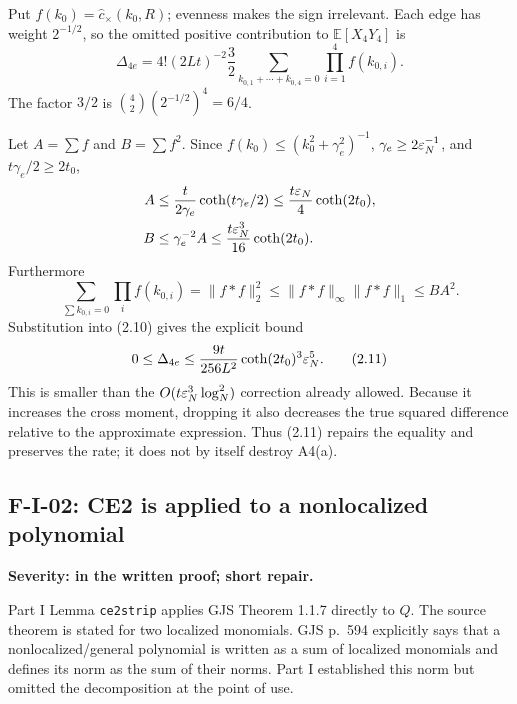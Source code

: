 \documentclass[11pt,a4paper]{article}
\begin{document}
Put $f(k_0)=\widehat c_\times(k_0,R)$; evenness makes the sign irrelevant.  Each edge
has weight $2^{-1/2}$, so the omitted positive contribution to
$\mathbb E[X_4Y_4]$ is
\begin{equation}
 \Delta_{4e}=4!(2Lt)^{-2}\frac32
 \sum_{k_{0,1}+\cdots+k_{0,4}=0}\prod_{i=1}^4f(k_{0,i}).
 \tag{2.10}
\end{equation}
The factor $3/2$ is
$\binom42(2^{-1/2})^4=6/4$.

Let $A=\sum f$ and $B=\sum f^2$.  Since
$f(k_0)\le(k_0^2+\gamma_e^2)^{-1}$,
$\gamma_e\ge2\varepsilon_N^{-1}$, and $t\gamma_e/2\ge2t_0$,
\begin{align*}
 A&\le\frac{t}{2\gamma_e}\coth(t\gamma_e/2)
 \le\frac{t\varepsilon_N}{4}\coth(2t_0),\\
 B&\le\gamma_e^{-2}A
 \le\frac{t\varepsilon_N^3}{16}\coth(2t_0).
\end{align*}
Furthermore
\[
 \sum_{\sum k_{0,i}=0}\prod_i f(k_{0,i})
 =\|f*f\|_2^2
 \le\|f*f\|_\infty\|f*f\|_1
 \le B A^2.
\]
Substitution into (2.10) gives the explicit bound
\begin{equation}
 0\le\Delta_{4e}\le
 \frac{9t}{256L^2}\coth(2t_0)^3\varepsilon_N^5.
 \tag{2.11}
\end{equation}
This is smaller than the $O(t\varepsilon_N^3\log_N^2)$ correction already allowed.  Because it
increases the cross moment, dropping it also decreases the true squared difference
relative to the approximate expression.  Thus (2.11) repairs the equality and preserves
the rate; it does not by itself destroy A4(a).

\subsection{F-I-02: CE2 is applied to a nonlocalized polynomial}

\begin{finding}
\textbf{Severity: \Major in the written proof; short repair.}

Part I Lemma \texttt{ce2strip} applies GJS Theorem 1.1.7 directly to $Q$.  The source
theorem is stated for two localized monomials.  GJS p.~594 explicitly says that a
nonlocalized/general polynomial is written as a sum of localized monomials and defines
its norm as the sum of their norms.  Part I established this norm but omitted the
decomposition at the point of use.
\end{finding}
\end{document}
